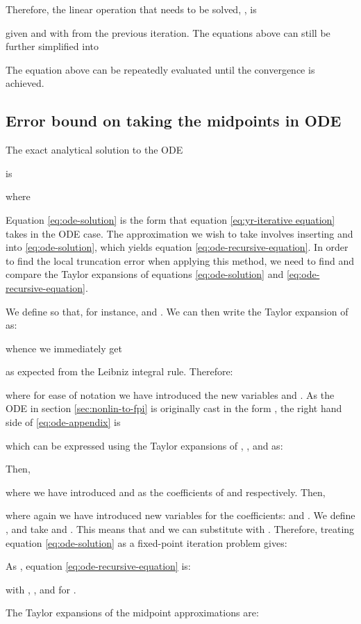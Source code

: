 Therefore, the linear operation that needs to be solved, , is

given  and  with  from the previous iteration.
The equations above can still be further simplified into

The equation above can be repeatedly evaluated until the convergence is achieved.

\subsection{Error bound on taking the midpoints in ODE}
\label{appsec:error-bound-midpoints-ode}

The exact analytical solution to the ODE

is 

where 

Equation \ref{eq:ode-solution} is the form that equation \ref{eq:yr-iterative equation} takes in the ODE case. The approximation we wish to take involves inserting  and  into \ref{eq:ode-solution}, which yields equation \ref{eq:ode-recursive-equation}. In order to find the local truncation error when applying this method, we need to find and compare the Taylor expansions of equations \ref{eq:ode-solution} and \ref{eq:ode-recursive-equation}. 

We define  so that, for instance,  and . We can then write the Taylor expansion of  as:

whence we immediately get 


as expected from the Leibniz integral rule. Therefore:

where for ease of notation we have introduced the new variables  and . As the ODE in section \ref{sec:nonlin-to-fpi} is originally cast in the form , the right hand side of \ref{eq:ode-appendix} is


which can be expressed using the Taylor expansions of , , and  as:

Then, 

where we have introduced  and  as the coefficients of  and  respectively. Then,

where again we have introduced new variables for the coefficients:  and . We define , and take  and .  This means that  and we can substitute  with . Therefore, treating equation \ref{eq:ode-solution} as a fixed-point iteration problem gives:

As , equation \ref{eq:ode-recursive-equation} is:

with , , and  for . 

The Taylor expansions of the midpoint approximations are:


